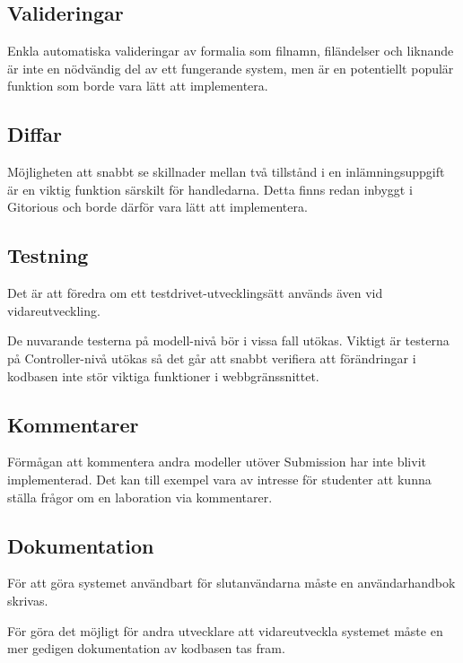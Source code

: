 \subsection{Valideringar}
Enkla automatiska valideringar av formalia som filnamn, filändelser och liknande är inte en nödvändig del av ett fungerande system, men är en potentiellt populär funktion som borde vara lätt att implementera.

\subsection{Diffar}

Möjligheten att snabbt se skillnader mellan två tillstånd i en inlämningsuppgift är en viktig funktion särskilt för handledarna. Detta finns redan inbyggt i Gitorious och borde därför vara lätt att implementera.

\subsection{Testning}

Det är att föredra om ett testdrivet-utvecklingsätt används även vid vidareutveckling.

De nuvarande testerna på modell-nivå bör i vissa fall utökas. Viktigt är testerna på Controller-nivå utökas så det går att snabbt verifiera att förändringar i kodbasen inte stör viktiga funktioner i webbgränssnittet. 


\subsection{Kommentarer}
Förmågan att kommentera andra modeller utöver Submission har inte blivit implementerad. Det kan till exempel vara av intresse för studenter att kunna ställa frågor om en laboration via kommentarer. 

\subsection{Dokumentation}
För att göra systemet användbart för slutanvändarna måste en användarhandbok skrivas. 

För göra det möjligt för andra utvecklare att vidareutveckla systemet måste en mer gedigen dokumentation av kodbasen tas fram.
